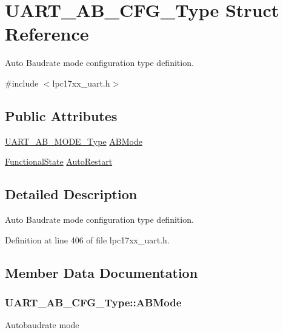 \hypertarget{struct_u_a_r_t___a_b___c_f_g___type}{\section{\-U\-A\-R\-T\-\_\-\-A\-B\-\_\-\-C\-F\-G\-\_\-\-Type \-Struct \-Reference}
\label{struct_u_a_r_t___a_b___c_f_g___type}
}


\-Auto \-Baudrate mode configuration type definition.  




{\ttfamily \#include $<$lpc17xx\-\_\-uart.\-h$>$}

\subsection*{\-Public \-Attributes}
\begin{DoxyCompactItemize}
\item 
\hyperlink{group___u_a_r_t___public___types_ga0a6689108a4f3651d2188ea8a2c17d4a}{\-U\-A\-R\-T\-\_\-\-A\-B\-\_\-\-M\-O\-D\-E\-\_\-\-Type} \hyperlink{struct_u_a_r_t___a_b___c_f_g___type_adc6d9350cdcf1474f1f6e3263929f86d}{\-A\-B\-Mode}
\item 
\hyperlink{group___l_p_c___types___public___types_gac9a7e9a35d2513ec15c3b537aaa4fba1}{\-Functional\-State} \hyperlink{struct_u_a_r_t___a_b___c_f_g___type_acd37001da8b70352858651e359dbbd65}{\-Auto\-Restart}
\end{DoxyCompactItemize}


\subsection{\-Detailed \-Description}
\-Auto \-Baudrate mode configuration type definition. 

\-Definition at line 406 of file lpc17xx\-\_\-uart.\-h.



\subsection{\-Member \-Data \-Documentation}
\hypertarget{struct_u_a_r_t___a_b___c_f_g___type_adc6d9350cdcf1474f1f6e3263929f86d}{
\subsubsection[{\-A\-B\-Mode}]{ {\bf \-U\-A\-R\-T\-\_\-\-A\-B\-\_\-\-C\-F\-G\-\_\-\-Type\-::\-A\-B\-Mode}}}\label{struct_u_a_r_t___a_b___c_f_g___type_adc6d9350cdcf1474f1f6e3263929f86d}
\-Autobaudrate mode 

